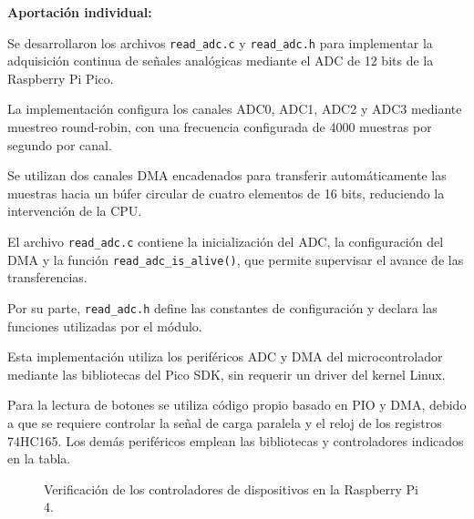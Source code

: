 \medskip
\textbf{Aportación individual:}

Se desarrollaron los archivos \texttt{read\_adc.c} y
\texttt{read\_adc.h} para implementar la adquisición
continua de señales analógicas mediante el ADC de
12 bits de la Raspberry Pi Pico.

La implementación configura los canales ADC0, ADC1,
ADC2 y ADC3 mediante muestreo round-robin, con una
frecuencia configurada de 4000 muestras por segundo
por canal.

Se utilizan dos canales DMA encadenados para transferir
automáticamente las muestras hacia un búfer circular
de cuatro elementos de 16 bits, reduciendo la
intervención de la CPU.

El archivo \texttt{read\_adc.c} contiene la inicialización
del ADC, la configuración del DMA y la función
\texttt{read\_adc\_is\_alive()}, que permite supervisar
el avance de las transferencias.

Por su parte, \texttt{read\_adc.h} define las constantes
de configuración y declara las funciones utilizadas
por el módulo.

Esta implementación utiliza los periféricos ADC y DMA
del microcontrolador mediante las bibliotecas del
Pico SDK, sin requerir un driver del kernel Linux.

Para la lectura de botones se utiliza código propio
basado en PIO y DMA, debido a que se requiere controlar
la señal de carga paralela y el reloj de los registros
74HC165. Los demás periféricos emplean las bibliotecas
y controladores indicados en la tabla.

\begin{figure}[H]
    \centering
    \caption{Verificación de los controladores
    de dispositivos en la Raspberry Pi 4.}
    \label{fig:drivers}
\end{figure}
